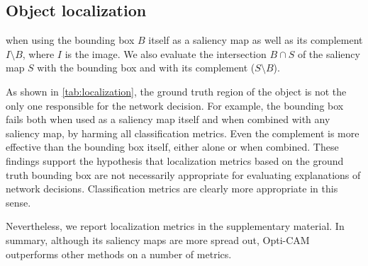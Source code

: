 \subsection{Object localization}

 when using the bounding box $B$ itself as a saliency map as well as its complement $I \setminus B$, where $I$ is the image. We also evaluate the intersection $B \cap S$ of the saliency map $S$ with the bounding box and with its complement ($S \setminus B$).

As shown in \autoref{tab:localization}, the ground truth region of the object is not the only one responsible for the network decision. For example, the bounding box fails both when used as a saliency map itself and when combined with any saliency map, by harming all classification metrics. Even the complement is more effective than the bounding box itself, either alone or when combined. These findings support the hypothesis that localization metrics based on the ground truth bounding box are not necessarily appropriate for evaluating explanations of network decisions. Classification metrics are clearly more appropriate in this sense.

Nevertheless, we report localization metrics in the supplementary material. In summary, although its saliency maps are more spread out, Opti-CAM outperforms other methods on a number of metrics.

